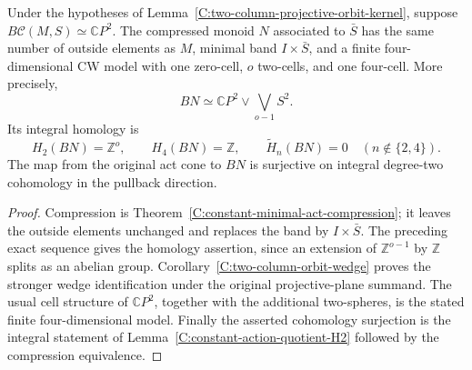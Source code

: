 \begin{lemma}
\label{C:two-column-finite-quotient-model}
Under the hypotheses of
Lemma~\ref{C:two-column-projective-orbit-kernel}, suppose
$B\mathcal C(M,S)\simeq\mathbb CP^2$.
The compressed monoid $N$ associated to $\bar S$ has the same
number of outside elements as $M$, minimal band
$I\times\bar S$, and a finite four-dimensional CW model with
one zero-cell, $o$ two-cells, and one four-cell. More precisely,
\[
 BN\simeq\mathbb CP^2\vee\bigvee_{o-1}S^2.
\]
Its integral
homology is
\[
 H_2(BN)=\mathbb Z^o,\qquad H_4(BN)=\mathbb Z,
 \qquad \widetilde H_n(BN)=0\quad(n\notin\{2,4\}).
\]
The map from the original act cone to $BN$ is surjective on
integral degree-two cohomology in the pullback direction.
\end{lemma}
\begin{proof}
Compression is Theorem~\ref{C:constant-minimal-act-compression};
it leaves the outside elements unchanged and replaces the band
by $I\times\bar S$.  The preceding exact sequence gives the
homology assertion, since an extension of $\mathbb Z^{o-1}$
by $\mathbb Z$ splits as an abelian group.
Corollary~\ref{C:two-column-orbit-wedge} proves the stronger
wedge identification under the original projective-plane summand.
The usual cell structure of $\mathbb CP^2$, together with the
additional two-spheres, is the stated finite four-dimensional model.
Finally the asserted cohomology surjection is the integral
statement of Lemma~\ref{C:constant-action-quotient-H2} followed
by the compression equivalence.
\end{proof}

